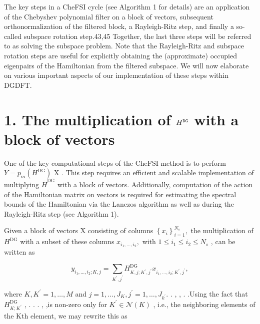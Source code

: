 \documentclass[
  10
]{article}
\begin{document}
The key steps in a CheFSI cycle (see Algorithm 1 for details) are an
application of the Chebyshev polynomial filter on a block of vectors,
subsequent orthonormalization of the filtered block, a Rayleigh-Ritz
step, and finally a so-called subspace rotation step.43,45 Together, the
last three steps will be referred to as solving the subspace problem.
Note that the Rayleigh-Ritz and subspace rotation steps are useful for
explicitly obtaining the (approximate) occupied eigenpairs of the
Hamiltonian from the filtered subspace. We will now elaborate on various
important aspects of our implementation of these steps within DGDFT.

\section{\texorpdfstring{1. The multiplication of \(H ^ { \tt D G }\)
with a block of
vectors}{1. The multiplication of H \^{} \{ \textbackslash tt D G \} with a block of vectors}}\label{the-multiplication-of-h-tt-d-g-with-a-block-of-vectors}

One of the key computational steps of the CheFSI method is to perform
\(Y = p _ { m } ( H ^ { \mathrm { D G } } )\) X . This step requires an
efficient and scalable implementation of multiplying
\(\bar { H } ^ { \mathrm { D G } }\) with a block of vectors.
Additionally, computation of the action of the Hamiltonian matrix on
vectors is required for estimating the spectral bounds of the
Hamiltonian via the Lanczos algorithm as well as during the
Rayleigh-Ritz step (see Algorithm 1).

Given a block of vectors X consisting of columns
\(\left\{ x _ { i } \right\} _ { i = 1 } ^ { N _ { s } } ,\) the
multiplication of \(H ^ { \mathrm { D G } }\) with a subset of these
columns \(x _ { i _ { 1 } , \dots , i _ { 2 } } ,\) with
\(1 \leq i _ { 1 } \leq i _ { 2 } \leq N _ { s }\) , can be written as

\[
y _ {i _ {1}, \dots , i _ {2}; K, j} = \sum_ {K ^ {\prime}, j ^ {\prime}} H _ {K, j; K ^ {\prime}, j ^ {\prime}} ^ {\mathrm{DG}} x _ {i _ {1}, \dots , i _ {2}; K ^ {\prime}, j ^ {\prime}}, \tag {10}
\]

where \(K , K ^ { \prime } = 1 , \ldots , M\) and
\(j = 1 , \dotsc , J _ { K } , j ^ { \prime } = 1 , \dotsc , J _ { k ^ { \prime } } .\)
. , , . .Using the fact that
\(H _ { K ; K ^ { \prime } } ^ { \mathrm { { D G } } }\) , . . . , ,is
non-zero only for \(K ^ { \prime } \in { \mathcal { N } } ( K )\) ,
i.e., the neighboring elements of the Kth element, we may rewrite this
as
\end{document}
